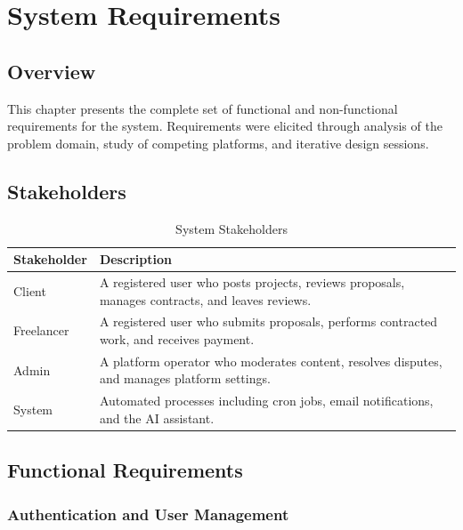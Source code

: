 \chapter{System Requirements}

\section{Overview}

This chapter presents the complete set of functional and non-functional requirements for the \projectname{} system. Requirements were elicited through analysis of the problem domain, study of competing platforms, and iterative design sessions.

\section{Stakeholders}

\begin{table}[H]
\centering
\caption{System Stakeholders}
\begin{tabularx}{\textwidth}{lX}
\toprule
\textbf{Stakeholder} & \textbf{Description} \\
\midrule
Client    & A registered user who posts projects, reviews proposals, manages contracts, and leaves reviews. \\
Freelancer & A registered user who submits proposals, performs contracted work, and receives payment. \\
Admin     & A platform operator who moderates content, resolves disputes, and manages platform settings. \\
System    & Automated processes including cron jobs, email notifications, and the AI assistant. \\
\bottomrule
\end{tabularx}
\end{table}

\section{Functional Requirements}

\subsection{Authentication and User Management}

